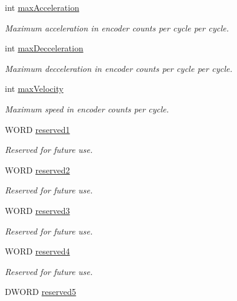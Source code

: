 \begin{DoxyCompactItemize}
int \hyperlink{struct_m_o_t___stage_axis_parameters_ae9c82835218d2d42f259929b99aa01ce}{max\+Acceleration}
\begin{DoxyCompactList}\small\item\em Maximum acceleration in encoder counts per cycle per cycle. \end{DoxyCompactList}\item 
int \hyperlink{struct_m_o_t___stage_axis_parameters_ada7c78561d8d3c1e967aaf750ed55d71}{max\+Decceleration}
\begin{DoxyCompactList}\small\item\em Maximum decceleration in encoder counts per cycle per cycle. \end{DoxyCompactList}\item 
int \hyperlink{struct_m_o_t___stage_axis_parameters_af56eaf0e89f76b8188846feb5ba40074}{max\+Velocity}
\begin{DoxyCompactList}\small\item\em Maximum speed in encoder counts per cycle. \end{DoxyCompactList}\item 
W\+O\+RD \hyperlink{struct_m_o_t___stage_axis_parameters_ae32908f1de15dc6f705cb0c5ff80571b}{reserved1}
\begin{DoxyCompactList}\small\item\em Reserved for future use. \end{DoxyCompactList}\item 
W\+O\+RD \hyperlink{struct_m_o_t___stage_axis_parameters_abb92e3a8c878f2d205c944cd1e738643}{reserved2}
\begin{DoxyCompactList}\small\item\em Reserved for future use. \end{DoxyCompactList}\item 
W\+O\+RD \hyperlink{struct_m_o_t___stage_axis_parameters_a1d950f71315968934ac64b594825e4f9}{reserved3}
\begin{DoxyCompactList}\small\item\em Reserved for future use. \end{DoxyCompactList}\item 
W\+O\+RD \hyperlink{struct_m_o_t___stage_axis_parameters_aa0fe95b4dd91fa3bf307cc47c61ceda1}{reserved4}
\begin{DoxyCompactList}\small\item\em Reserved for future use. \end{DoxyCompactList}\item 
D\+W\+O\+RD \hyperlink{struct_m_o_t___stage_axis_parameters_afedcba3db2ebd97a3b98e86f529fded6}{reserved5}

\end{DoxyCompactItemize}
